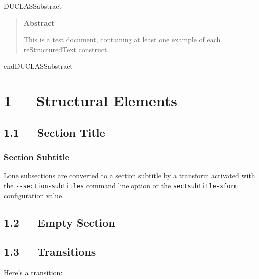 \documentclass[a4paper]{article}
\newenvironment{DUclass}[1]%
    {%
     \def\DocutilsClassFunctionName{DUCLASS#1}
     \csname \DocutilsClassFunctionName \endcsname}%
    {\csname end\DocutilsClassFunctionName \endcsname}%
\providecommand*{\DUtitle}[1]{%
  \smallskip\noindent\textbf{#1}\smallskip}
\providecommand*{\DUtransition}{%
  \hspace*{\fill}\hrulefill\hspace*{\fill}
  \vskip 0.5\baselineskip
}
\begin{document}
\begin{DUclass}{abstract}
\begin{quote}
\DUtitle{Abstract}

This is a test document, containing at least one example of each
reStructuredText construct.
\end{quote}
\end{DUclass}




\pagebreak[4] %

\label{table-of-contents}
\renewcommand{\contentsname}{Table of Contents}
\tableofcontents


\section{1   Structural Elements}


\subsection{1.1   Section Title%
  \label{section-title}%
}
\subsubsection*{Section Subtitle}

Lone subsections are converted to a section subtitle by a transform
activated with the \texttt{-{}-section-subtitles} command line option or the
\texttt{sectsubtitle-xform} configuration value.


\subsection{1.2   Empty Section}


\subsection{1.3   Transitions}

Here’s a transition:

\DUtransition
\end{document}
